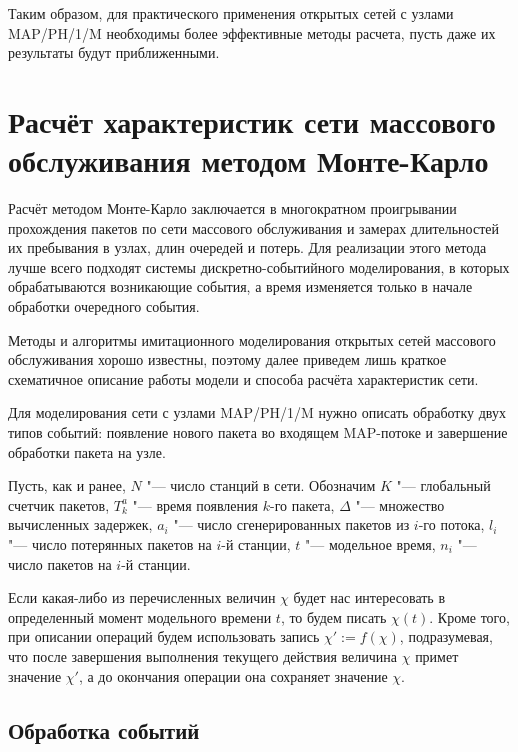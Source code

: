 Таким образом, для практического применения открытых сетей с узлами MAP/PH/1/M необходимы более эффективные методы расчета, пусть даже их результаты будут приближенными.




\section{Расчёт характеристик сети массового обслуживания методом Монте-Карло}

Расчёт методом Монте-Карло заключается в многократном проигрывании прохождения пакетов по сети массового обслуживания и замерах длительностей их пребывания в узлах, длин очередей и потерь. Для реализации этого метода лучше всего подходят системы дискретно-событийного моделирования, в которых обрабатываются возникающие события, а время изменяется только в начале обработки очередного события.

Методы и алгоритмы имитационного моделирования открытых сетей массового обслуживания хорошо известны, поэтому далее приведем лишь краткое схематичное описание работы модели и способа расчёта характеристик сети.

Для моделирования сети с узлами MAP/PH/1/M нужно описать обработку двух типов событий: появление нового пакета во входящем MAP-потоке и завершение обработки пакета на узле.

Пусть, как и ранее, $N$ "--- число станций в сети. Обозначим $K$ "--- глобальный счетчик пакетов, $T_k^a$ "--- время появления $k$-го пакета, $\Delta$ "--- множество вычисленных задержек, $a_i$ "--- число сгенерированных пакетов из $i$-го потока, $l_i$ "--- число потерянных пакетов на $i$-й станции, $t$ "--- модельное время, $n_i$ "--- число пакетов на $i$-й станции.

Если какая-либо из перечисленных величин $\chi$ будет нас интересовать в определенный момент модельного времени $t$, то будем писать $\chi(t)$. Кроме того, при описании операций будем использовать запись $\chi' := f(\chi)$, подразумевая, что после завершения выполнения текущего действия величина $\chi$ примет значение $\chi'$, а до окончания операции она сохраняет значение $\chi$.


\subsection{Обработка событий}

